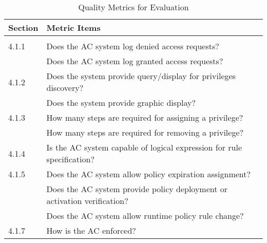 {
\renewcommand{\arraystretch}{1.5}%
\begin{table}[htb]
	\centering
	\small

	\caption{Quality Metrics for Evaluation}
	\label{tab:qualityMetrics}
	\begin{tabular}{l|l}
		\hline \bf Section & \bf Metric Items                                                                                                      \\ \hline
		\rowcolor{lightgray} \multicolumn{2}{l}{Administration Properties}                                                                         \\ \hline
		4.1.1              & \llap{\textbullet} Does the AC system log denied access requests?                                                     \\
		                   & \llap{\textbullet} Does the AC system log granted access requests?                                                    \\ \hline
		4.1.2              & \llap{\textbullet} Does the system provide query/display for privileges discovery?                                    \\
		                   & \llap{\textbullet} Does the system provide graphic display?                                                           \\ \hline
		4.1.3              & \llap{\textbullet} How many steps are required for assigning a privilege?                                             \\
		                   & \llap{\textbullet} How many steps are required for removing a privilege?                                              \\ \hline
		4.1.4              & \llap{\textbullet} Is the AC system capable of logical expression for rule specification?                             \\ \hline
		4.1.5              & \llap{\textbullet} Does the AC system allow policy expiration assignment?                                             \\
		                   & \llap{\textbullet} Does the AC system provide policy deployment or activation verification?                           \\
		                   & \llap{\textbullet} Does the AC system allow runtime policy rule change?                                               \\ \hline
		4.1.7              & \llap{\textbullet} How is the AC enforced?                                                                            \\ \hline

\end{tabular}
\end{table}}
